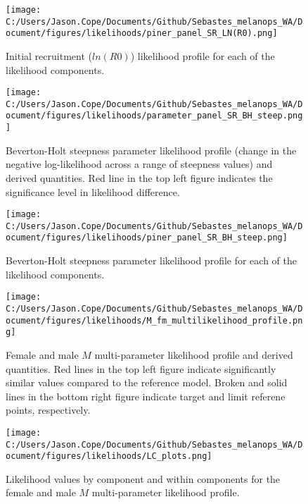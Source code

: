 \documentclass[11pt,
  english,
  letterpaper,
]{article}
\begin{document}
\pagebreak

\begin{figure}
\centering
\texttt{[image: C:/Users/Jason.Cope/Documents/Github/Sebastes\_melanops\_WA/Document/figures/likelihoods/piner\_panel\_SR\_LN(R0).png]}
\caption{Initial recruitment (\(ln(R0)\)) likelihood profile for each of the likelihood components.\label{fig:R0-profile-components}}
\end{figure}

\pagebreak

\begin{figure}
\centering
\texttt{[image: C:/Users/Jason.Cope/Documents/Github/Sebastes\_melanops\_WA/Document/figures/likelihoods/parameter\_panel\_SR\_BH\_steep.png]}
\caption{Beverton-Holt steepness parameter likelihood profile (change in the negative log-likelihood across a range of steepness values) and derived quantities. Red line in the top left figure indicates the significance level in likelihood difference.\label{fig:steepness-profile}}
\end{figure}

\pagebreak

\begin{figure}
\centering
\texttt{[image: C:/Users/Jason.Cope/Documents/Github/Sebastes\_melanops\_WA/Document/figures/likelihoods/piner\_panel\_SR\_BH\_steep.png]}
\caption{Beverton-Holt steepness parameter likelihood profile for each of the likelihood components.\label{fig:steepness-profile-components}}
\end{figure}

\pagebreak

\begin{figure}
\centering
\texttt{[image: C:/Users/Jason.Cope/Documents/Github/Sebastes\_melanops\_WA/Document/figures/likelihoods/M\_fm\_multilikelihood\_profile.png]}
\caption{Female and male \(M\) multi-parameter likelihood profile and derived quantities. Red lines in the top left figure indicate significantly similar values compared to the reference model. Broken and solid lines in the bottom right figure indicate target and limit referene points, respectively.\label{fig:M-multiprofile-combo}}
\end{figure}

\pagebreak

\begin{figure}
\centering
\texttt{[image: C:/Users/Jason.Cope/Documents/Github/Sebastes\_melanops\_WA/Document/figures/likelihoods/LC\_plots.png]}
\caption{Likelihood values by component and within components for the female and male \(M\) multi-parameter likelihood profile.\label{fig:M-multiprofile-like-components}}
\end{figure}
\end{document}

